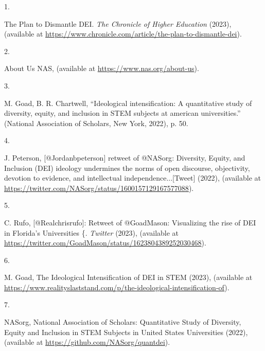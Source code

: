 \documentclass[
  12pt,
  man, donotrepeattitle]{apa6}
\newlength{\cslhangindent}
\newlength{\csllabelwidth}
\newlength{\cslentryspacingunit} %
\newenvironment{CSLReferences}[2] %
 {%
  \setlength{\parindent}{0pt}
  \ifodd #1
  \let\oldpar\par
  \def\par{\hangindent=\cslhangindent\oldpar}
  \fi
  \setlength{\parskip}{#2\cslentryspacingunit}
 }%
 {}
\newcommand{\CSLLeftMargin}[1]{\parbox[t]{\csllabelwidth}{#1}}
\newcommand{\CSLRightInline}[1]{\parbox[t]{\linewidth - \csllabelwidth}{#1}\break}
\begin{document}
\hypertarget{refs}{}
\begin{CSLReferences}{0}{0}
\leavevmode{}%
\CSLLeftMargin{1. }%
\CSLRightInline{The {Plan} to {Dismantle} {DEI}. \emph{The Chronicle of Higher Education} (2023), (available at \url{https://www.chronicle.com/article/the-plan-to-dismantle-dei}).}

\leavevmode{}%
\CSLLeftMargin{2. }%
\CSLRightInline{About {Us} {\textbar} {NAS}, (available at \url{https://www.nas.org/about-us}).}

\leavevmode{}%
\CSLLeftMargin{3. }%
\CSLRightInline{M. Goad, B. R. Chartwell, {``Ideological intensification: {A} quantitative study of diversity, equity, and inclusion in {STEM} subjects at american universities.''} (National Association of Scholars, New York, 2022), p. 50.}

\leavevmode{}%
\CSLLeftMargin{4. }%
\CSLRightInline{J. Peterson, {[}@Jordanbpeterson{]} retweet of @{NASorg}: {Diversity}, {Equity}, and {Inclusion} ({DEI}) ideology undermines the norms of open discourse, objectivity, devotion to evidence, and intellectual independence...{[}{Tweet}{]} (2022), (available at \url{https://twitter.com/NASorg/status/1600157129167577088}).}

\leavevmode{}%
\CSLLeftMargin{5. }%
\CSLRightInline{C. Rufo, {[}@Realchrisrufo{]}: Retweet of @{GoadMason}: {Visualizing} the rise of {DEI} in {Florida}'s {Universities} \{\vphantom{\}}{Tweet}{]}. \emph{Twitter} (2023), (available at \url{https://twitter.com/GoadMason/status/1623804389252030468}).}

\leavevmode{}%
\CSLLeftMargin{6. }%
\CSLRightInline{M. Goad, The {Ideological} {Intensification} of {DEI} in {STEM} (2023), (available at \url{https://www.realityslaststand.com/p/the-ideological-intensification-of}).}

\leavevmode{}%
\CSLLeftMargin{7. }%
\CSLRightInline{NASorg, National {Association} of {Scholars}: {Quantitative} {Study} of {Diversity}, {Equity} and {Inclusion} in {STEM} {Subjects} in {United} {States} {Universities} (2022), (available at \url{https://github.com/NASorg/quantdei}).}

\end{CSLReferences}


\clearpage
\renewcommand{\listfigurename}{Figure captions}
\end{document}
